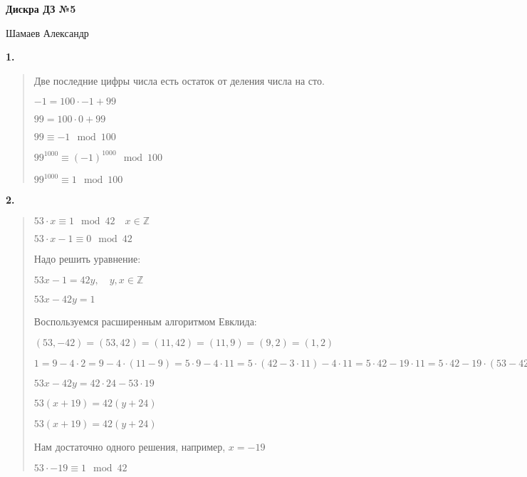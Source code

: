 \documentclass{article}
\begin{document}
\setlength{\parindent}{0pt}
\begin{Large}
    \textsf{\textbf{Дискра ДЗ №5}}
    
    Шамаев Александр    
\end{Large}
\vspace{1cm}



\textsf{\textbf{1.}}
\begin{quote}

Две последние цифры числа есть остаток от деления числа на сто.

$-1 = 100 \cdot -1 + 99$

$99 = 100 \cdot 0 + 99$

$99 \equiv -1 \mod{100}$

$99^{1000} \equiv (-1)^{1000} \mod{100}$

$99^{1000} \equiv 1 \mod{100}$

\end{quote}

\textbf{\textsf{2.}}
\begin{quote}
    
    $53 \cdot x \equiv 1 \mod 42 \quad x \in \mathbb{Z}$

    $53 \cdot x - 1 \equiv 0 \mod 42$

    Надо решить уравнение:
    
    $53x - 1 = 42y, \quad y, x \in \mathbb{Z}$

    $53x - 42y = 1$

    Воспользуемся расширенным алгоритмом Евклида:
    
    $(53, -42) = (53, 42) = (11, 42) = (11, 9) = (9, 2) = (1, 2)$
    
    $ 1 = 9 - 4\cdot 2 = 9 - 4\cdot (11 - 9) = 5 \cdot 9 - 4 \cdot 11 = 5 \cdot (42 - 3 \cdot 11) - 4\cdot 11 = 5 \cdot 42 - 19 \cdot 11 = 5 \cdot 42 - 19 \cdot (53 - 42) = \mathbf{24 \cdot 42 - 19 \cdot 53}$
    
    $53x - 42y = 42 \cdot 24 - 53 \cdot 19$
    
    $53(x + 19)= 42(y + 24)$
    
    $53(x + 19)= 42(y + 24)$

    Нам достаточно одного решения, например, $x = -19$

    $53 \cdot -19 \equiv 1 \mod {42}$

    
\end{quote}
\end{document}
